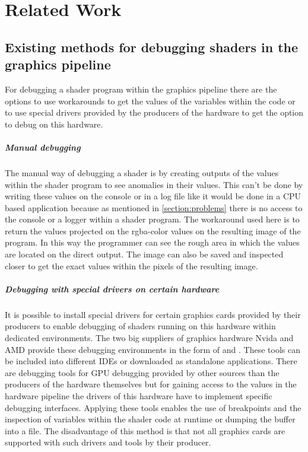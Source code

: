 
\chapter{Related Work}\label{cha:RelatedWork}
\section{Existing methods for debugging shaders in the graphics pipeline}
\label{section:debuggingMethods}

For debugging a shader program within the graphics pipeline there are the options to use workarounds to get the values of the variables within the code or to use special drivers provided by the producers of the hardware to get the option to debug on this hardware.

\paragraph{Manual debugging}

The manual way of debugging a shader is by creating outputs of the values within the shader program to see anomalies in their values. This can't be done by writing these values on the console or in a log file like it would be done in a CPU based application because as mentioned in \autoref{section:problems} there is no access to the console or a logger within a shader program. The workaround used here is to return the values projected on the rgba-color values on the resulting image of the program. In this way the programmer can see the rough area in which the values are located on the direct output. The image can also be saved and inspected closer to get the exact values within the pixels of the resulting image.

\paragraph{Debugging with special drivers on certain hardware}
\label{section:debuggingMethods_drivers}

It is possible to install special drivers for certain graphics cards provided by their producers to enable debugging of shaders running on this hardware within dedicated environments. The two big suppliers of graphics hardware Nvida and AMD provide these debugging environments in the form of \cite{Nvidia_Nsight} and \cite{AMD_GPUPerfStudio}. These tools can be included into different IDEs or downloaded as standalone applications. There are debugging tools for GPU debugging provided by other sources than the producers of the hardware themselves but for gaining access to the values in the hardware pipeline the drivers of this hardware have to implement specific debugging interfaces. Applying these tools enables the use of breakpoints and the inspection of variables within the shader code at runtime or dumping the buffer into a file. The disadvantage of this method is that not all graphics cards are supported with such drivers and tools by their producer.

